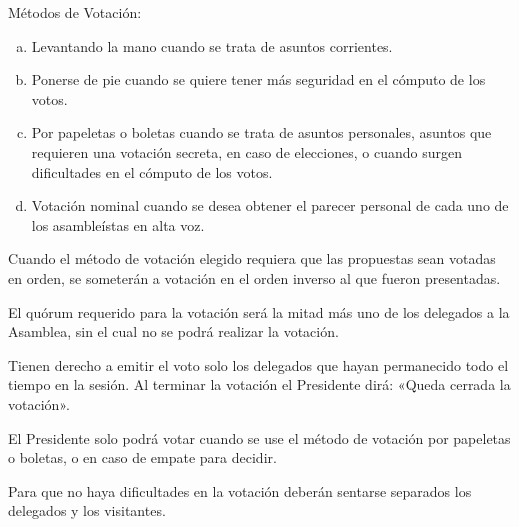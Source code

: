 \article
Métodos de Votación:
\begin{enumerate}[a)]
    \item Levantando la mano cuando se trata de asuntos corrientes.
    \item Ponerse de pie cuando se quiere tener más seguridad en el cómputo de los votos.
    \item Por papeletas o boletas cuando se trata de asuntos personales, asuntos que requieren una votación secreta, en caso de elecciones, o cuando surgen dificultades en el cómputo de los votos.
    \item Votación nominal cuando se desea obtener el parecer personal de cada uno de los asambleístas en alta voz.
\end{enumerate}
Cuando el método de votación elegido requiera que las propuestas sean votadas en orden, se someterán a votación en el orden inverso al que fueron presentadas.

\article
El quórum requerido para la votación será la mitad más uno de los delegados a la Asamblea, sin el cual no se podrá realizar la votación.

\article
Tienen derecho a emitir el voto solo los delegados que hayan permanecido todo el tiempo en la sesión. Al terminar la votación el Presidente dirá: «Queda cerrada la votación».

\article
El Presidente solo podrá votar cuando se use el método de votación por papeletas o boletas, o en caso de empate para decidir.

\article
Para que no haya dificultades en la votación deberán sentarse separados los delegados y los visitantes.
